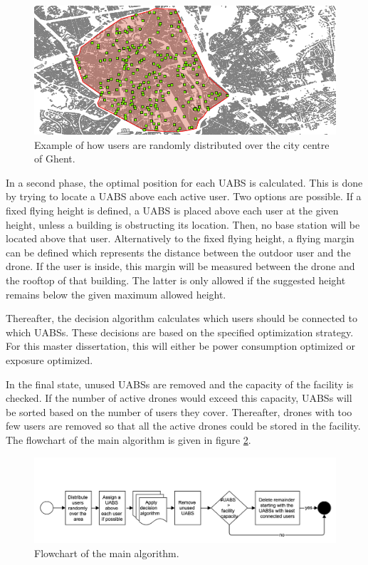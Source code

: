 \begin{figure}[h!]
\centering
 \includegraphics[width=.85\textwidth]{../images/cityCenterGhentUserDistributionB.png}
  \caption{Example of how users are randomly distributed over the city centre of Ghent.}
  \label{fig:userdistribution}
\end{figure}

In a second phase, the optimal position for each \gls{UABS} is calculated. This is done by trying to locate a \gls{UABS} above each active user. Two options are possible.
If a fixed flying height is defined, a \gls{UABS} is placed above each user at the given height, unless a building is obstructing its location. Then, no base station will be located above that user.
Alternatively to the fixed flying height, a flying margin can be defined which represents the distance between the outdoor user and  the drone.
If the user is inside, this margin will be measured between the drone and the rooftop of that building.
The latter is only allowed if the suggested height remains below the given maximum allowed height.

Thereafter, the decision algorithm calculates which users should be connected to which \gls{UABS}s. 
These decisions are based on the specified optimization strategy. For this master dissertation,
this will either be power consumption optimized or exposure optimized.

In the final state, unused \gls{UABS}s are removed and the capacity of the facility is checked. 
If the number of active drones would exceed this capacity, \gls{UABS}s will be sorted based on the number of 
users they cover. Thereafter, drones with too few users are removed so that all the active drones could be stored in the facility.
The flowchart of the main algorithm is given in figure \ref{fig:mainflow}.
\begin{figure}[h!]
\centering
 \includegraphics[width=\textwidth]{../images/mainflow.png}
  \caption{Flowchart of the main algorithm.}
  \label{fig:mainflow}
\end{figure}

